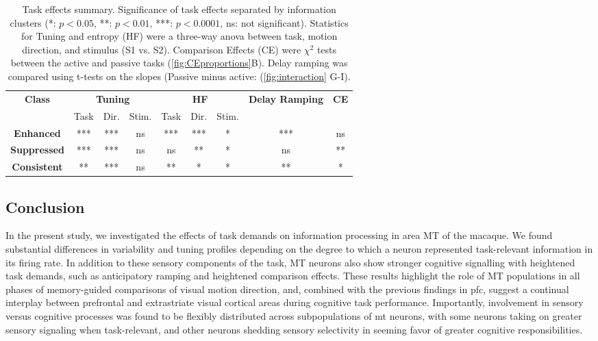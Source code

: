 \begin{center}
	\begin{table*}
		\begin{tabular}{|c|c|c|c|c|c|c|c|c|}
			\hline
			\textbf{Class} & \multicolumn{3}{|c|}{\textbf{Tuning}} & \multicolumn{3}{|c|}{\textbf{HF}} & \textbf{Delay Ramping} & \textbf{CE} \\
			\cline{2-7}
			& Task & Dir. & Stim. & Task & Dir. & Stim. &  &  \\
			\hline
			\textbf{\textcolor{enhanced}{Enhanced}} & *** & *** & ns  & *** & *** & * & *** & ns \\
			\textbf{\textcolor{suppressed}{Suppressed}} & *** & *** & ns & ns & ** & * & ns & ** \\
			\textbf{Consistent} & ** & *** & ns & ** & * & * & ** & * \\
			\hline
		\end{tabular}
		\caption{Task effects summary. Significance of task effects separated by information clusters (*: $p<0.05$, **: $p<0.01$, ***: $p<0.0001$, ns: not significant). Statistics for Tuning and entropy (HF) were a three-way anova between task, motion direction, and stimulus (S1 vs. S2). Comparison Effects (CE) were $\chi^2$ tests between the active and passive tasks (\ref{fig:CEproportions}B). Delay ramping was compared using t-tests on the slopes (Passive minus active: (\ref{fig:interaction} G-I).}
	\end{table*}
\end{center}

\subsection*{Conclusion}
In the present study, we investigated the effects of task demands on information processing in area MT of the macaque. We found substantial differences in variability and tuning profiles depending on the degree to which a neuron represented task-relevant information in its firing rate. In addition to these sensory components of the task, MT neurons also show stronger cognitive signalling with heightened task demands, such as anticipatory ramping and heightened comparison effects. These results highlight the role of MT populations in all phases of memory-guided comparisons of visual motion direction, and, combined with the previous findings in \gls{pfc}, suggest a continual interplay between prefrontal and extrastriate visual cortical areas during cognitive task performance. Importantly, involvement in sensory versus cognitive processes was found to be flexibly distributed across subpopulations of \gls{mt} neurons, with some neurons taking on greater sensory signaling when task-relevant, and other neurons shedding sensory selectivity in seeming favor of greater cognitive responsibilities.



